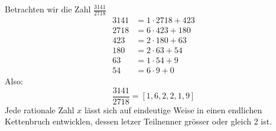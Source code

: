 Betrachten wir die Zahl $\frac{3141}{2718}$
\begin{align*}
3141 &= 1\cdot 2718 + 423 \\
2718 &= 6\cdot 423 + 180 \\
423 &= 2\cdot 180 + 63 \\
180 &= 2\cdot 63 + 54 \\
63 &= 1\cdot 54 + 9 \\
54 &= 6\cdot 9 + 0
\end{align*}
Also:
\begin{equation}
\frac{3141}{2718} = [1,6,2,2,1,9]
\end{equation}
Jede rationale Zahl $x$ lässt sich auf eindeutige Weise in einen
endlichen Kettenbruch entwicklen, dessen letzer Teilnenner grösser
oder gleich 2 ist.

